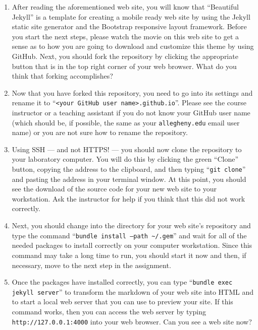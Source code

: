 \vspace*{-.15in}
\begin{enumerate}

  \itemsep0in

  \item After reading the aforementioned web site, you will know that ``Beautiful Jekyll'' is a template for creating a
    mobile ready web site by using the Jekyll static site generator and the Bootstrap responsive layout framework.
    Before you start the next steps, please watch the movie on this web site to get a sense as to how you are going to
    download and customize this theme by using GitHub. Next, you should fork the repository by clicking the appropriate
    button that is in the top right corner of your web browser. What do you think that forking accomplishes?

  \item Now that you have forked this repository, you need to go into its settings and rename it to ``{\tt <your GitHub
    user name>.github.io}''. Please see the course instructor or a teaching assistant if you do not know your GitHub
    user name (which should be, if possible, the same as your {\tt allegheny.edu} email user name) or you are not sure
    how to rename the repository.

  \item Using SSH --- and not HTTPS! --- you should now clone the repository to your laboratory computer. You will do
    this by clicking the green ``Clone'' button, copying the address to the clipboard, and then typing ``{\tt git
    clone}'' and pasting the address in your terminal window. At this point, you should see the download of the source
    code for your new web site to your workstation. Ask the instructor for help if you think that this did not work
    correctly.

  \item Next, you should change into the directory for your web site's repository and type the command ``{\tt bundle
    install --path \textasciitilde{}/.gem}'' and wait for all of the needed packages to install correctly on your
    computer workstation. Since this command may take a long time to run, you should start it now and then, if
    necessary, move to the next step in the assignment.

  \item Once the packages have installed correctly, you can type ``{\tt bundle exec jekyll server}'' to transform the
    markdown of your web site into HTML and to start a local web server that you can use to preview your site. If this
    command works, then you can access the web server by typing {\tt http://127.0.0.1:4000} into your web browser. Can
    you see a web site now?


\end{enumerate}
